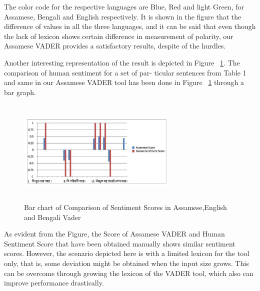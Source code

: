 \documentclass[conference]{IEEEtran}
\begin{document}
The color code for the respective languages are Blue, Red and light Green, for Assamese, Bengali and English respectively. It is shown in the figure that the difference of values in all the three languages, and it can be said that even though the lack of lexicon shows certain difference in measurement of polarity, our Assamese VADER provides a satisfactory results, despite of the hurdles.

Another interesting representation of the result is depicted in Figure ~\ref{fig:bar2}. The comparison of human sentiment for a set of par- ticular sentences from Table 1 and same in our Assamese VADER tool has been done in Figure ~\ref{fig:bar2} through a bar graph.
\begin{figure}[htbp]
    \begin{center}
        \includegraphics[height=2in,width=3in]{bar2.png}
        \caption{Bar chart of Comparison of Sentiment Scores in Assamese,English and Bengali Vader}
        \label{fig:bar2}
    \end{center}
\end{figure}

As evident from the Figure, the Score of Assamese VADER and Human Sentiment Score that have been obtained manually shows similar sentiment scores. However, the scenario depicted here is with a limited lexicon for the tool only, that is, some deviation might be obtained when the input size grows. This can be overcome through growing the lexicon of the VADER tool, which also can improve performance drastically.
\end{document}
